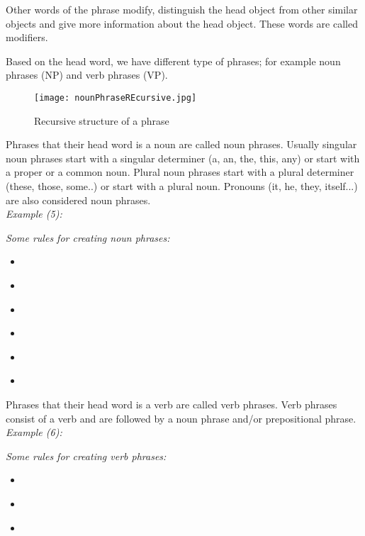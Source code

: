Other words of the phrase modify, distinguish the head object from other similar objects and give more information about the head object. These words are called modifiers.

Based on the head word, we have different type of phrases; for example noun phrases (NP) and verb phrases (VP).

\newpage
\begin{figure}[h]
   \begin{center}
	  \texttt{[image: nounPhraseREcursive.jpg]}
 	  \caption[Recursive structure of a phrase]{Recursive structure of a phrase}
	  \label{Figure 4}
    \end{center}
\end{figure}

Phrases that their head word is a noun are called noun phrases. Usually singular noun phrases start with a singular determiner (a, an, the, this, any) or start with a proper or a common noun. Plural noun phrases start with a plural determiner (these, those, some..) or start with a plural noun. Pronouns (it, he, they, itself...) are also considered noun phrases.\\

\emph{Example (5):}
\begin{changemargin}{10mm}{10mm}
   \emph{Some rules for creating noun phrases:}
   \begin{itemize}
  	    \item \emph{ }
  	    \item \emph{ }
  		\item \emph{ }
  		\item \emph{ }
  		\item \emph{ }
  		\item \emph{ }
   \end{itemize}
\end{changemargin}
\vspace{4mm}

Phrases that their head word is a verb are called verb phrases. Verb phrases consist of a verb and are followed by a noun phrase and/or prepositional phrase. \\

\emph{Example (6):}
\begin{changemargin}{10mm}{10mm}
   \emph{  Some rules for creating verb phrases:}
    \begin{itemize}
  	    \item \emph{ }
  		\item \emph{ }
  		\item \emph{ }
	\end{itemize}
\end{changemargin}

